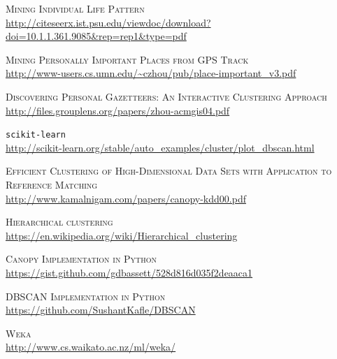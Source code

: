 \documentclass[a4paper, 12pt]{article}
\begin{document}


\newpage

\begin{thebibliography}{50}


\label{lifePatter} \textsc{Mining Individual Life Pattern} \\ \url{http://citeseerx.ist.psu.edu/viewdoc/download?doi=10.1.1.361.9085&rep=rep1&type=pdf}

\label{importantPlaces} \textsc{Mining Personally Important Places from GPS Track} \\ \url{http://www-users.cs.umn.edu/~czhou/pub/place-important_v3.pdf}

\label{clusteringApproach}\textsc{Discovering Personal Gazetteers: An Interactive Clustering Approach} \\ \url{http://files.grouplens.org/papers/zhou-acmgis04.pdf}

\label{scikit-learn} \texttt{scikit-learn} \\ \url{http://scikit-learn.org/stable/auto_examples/cluster/plot_dbscan.html} 

\label{canopy} \textsc{Efficient Clustering of High-Dimensional Data Sets with Application to Reference Matching} \\ \url{http://www.kamalnigam.com/papers/canopy-kdd00.pdf}

\label{jerar} \textsc{Hierarchical clustering} \\ \url{https://en.wikipedia.org/wiki/Hierarchical_clustering}

 \label{canopyGitHub} \textsc{Canopy Implementation in Python} \\ \url{https://gist.github.com/gdbassett/528d816d035f2deaaca1}

 \label{dbscanPython} \textsc{DBSCAN Implementation in Python} \\ \url{https://github.com/SushantKafle/DBSCAN}

 \label{weka} \textsc{Weka} \\ 	\url{http://www.cs.waikato.ac.nz/ml/weka/}
\end{thebibliography}
\end{document}
